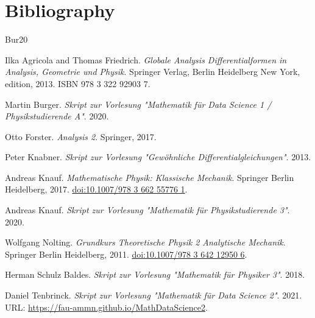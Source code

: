 \documentclass[letterpaper,10pt,english]{jupyterBook}
\begin{document}
\chapter{Bibliography}
\label{\detokenize{references:bibliography}}\label{\detokenize{references::doc}}
\par


\begin{sphinxthebibliography}{Bur20}
\par
Ilka Agricola and Thomas Friedrich. \emph{Globale Analysis   Differentialformen in Analysis, Geometrie und Physik}. Springer Verlag, Berlin Heidelberg New York, edition, 2013. ISBN 978 3 322 92903 7.
\par
Martin Burger. \emph{Skript zur Vorlesung "Mathematik für Data Science 1 / Physikstudierende A"}. 2020.
\par
Otto Forster. \emph{Analysis 2}. Springer, 2017.
\par
Peter Knabner. \emph{Skript zur Vorlesung "Gewöhnliche Differentialgleichungen"}. 2013.
\par
Andreas Knauf. \emph{Mathematische Physik: Klassische Mechanik}. Springer Berlin Heidelberg, 2017. \href{https://doi.org/10.1007/978-3-662-55776-1}{doi:10.1007/978 3 662 55776 1}.
\par
Andreas Knauf. \emph{Skript zur Vorlesung "Mathematik für Physikstudierende 3"}. 2020.
\par
Wolfgang Nolting. \emph{Grundkurs Theoretische Physik 2   Analytische Mechanik}. Springer Berlin Heidelberg, 2011. \href{https://doi.org/10.1007/978-3-642-12950-6}{doi:10.1007/978 3 642 12950 6}.
\par
Herman Schulz Baldes. \emph{Skript zur Vorlesung "Mathematik für Physiker 3"}. 2018.
\par
Daniel Tenbrinck. \emph{Skript zur Vorlesung "Mathematik für Data Science 2"}. 2021. URL: \url{https://fau-ammn.github.io/MathDataScience2}.
\end{sphinxthebibliography}






\renewcommand{\indexname}{Proof Index}


\renewcommand{\indexname}{Index}
\end{document}

